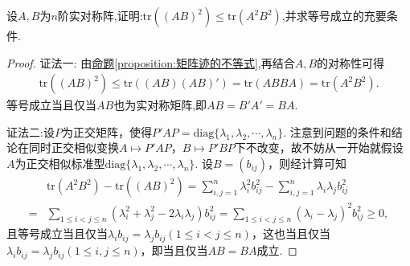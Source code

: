 \documentclass[../../main.tex]{subfiles}%
\begin{document}
\begin{example}
设\(A,B\)为\(n\)阶实对称阵,证明:\(\text{tr}((AB)^2)\leqslant \text{tr}(A^2B^2)\),并求等号成立的充要条件.
\end{example}
\begin{proof}

{\color{blue}证法一:}
由\hyperref[proposition:矩阵迹的不等式]{命题\ref{proposition:矩阵迹的不等式}},再结合$A,B$的对称性可得
\begin{align*}
\mathrm{tr}\left( \left( AB \right) ^2 \right) \leqslant \mathrm{tr}\left( \left( AB \right) \left( AB \right) ' \right) =\mathrm{tr}\left( ABBA \right) =\mathrm{tr}\left( A^2B^2 \right) .
\end{align*}
等号成立当且仅当$AB$也为实对称矩阵,即\(AB = B'A'=BA\).

{\color{blue}证法二:}设\(P\)为正交矩阵，使得\(P'AP = \mathrm{diag}\{\lambda_1,\lambda_2,\cdots,\lambda_n\}\). 注意到问题的条件和结论在同时正交相似变换\(A\mapsto P'AP\)，\(B\mapsto P'BP\)下不改变，故不妨从一开始就假设\(A\)为正交相似标准型\(\mathrm{diag}\{\lambda_1,\lambda_2,\cdots,\lambda_n\}\). 设\(B=(b_{ij})\)，则经计算可知
\begin{align*}
&\mathrm{tr}(A^2B^2)-\mathrm{tr}((AB)^2)=\sum_{i,j = 1}^{n}\lambda_i^2b_{ij}^2-\sum_{i,j = 1}^{n}\lambda_i\lambda_jb_{ij}^2\\
=&\sum_{1\leqslant  i<j\leqslant  n}(\lambda_i^2+\lambda_j^2 - 2\lambda_i\lambda_j)b_{ij}^2=\sum_{1\leqslant  i<j\leqslant  n}(\lambda_i - \lambda_j)^2b_{ij}^2\geqslant 0,
\end{align*}
且等号成立当且仅当\(\lambda_ib_{ij}=\lambda_jb_{ij}(1\leqslant  i<j\leqslant  n)\)，这也当且仅当\(\lambda_ib_{ij}=\lambda_jb_{ij}(1\leqslant  i,j\leqslant  n)\)，即当且仅当\(AB = BA\)成立. 

\end{proof}
\end{document}
